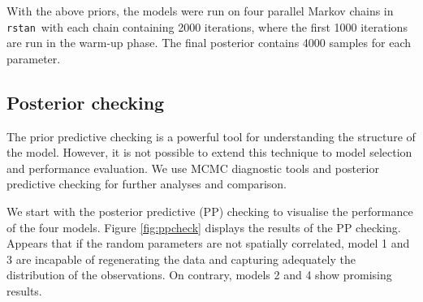 \documentclass[a4paper]{article}   	%
\newcommand{\rstan}{\texttt{rstan}}
\begin{document}
	With the above priors, the models were run on four parallel Markov chains in \rstan\ with each chain containing 2000 iterations, where the first 1000 iterations are run in the warm-up phase. The final posterior contains 4000 samples for each parameter. 	
	
	\subsection{Posterior checking}\label{ss:PostCheck}
	
	The prior predictive checking is a powerful tool for understanding the structure of the model. However, it is not possible to extend this technique to model selection and performance evaluation. We use MCMC diagnostic tools and posterior predictive checking for further analyses and comparison. 	
	
	We start with the posterior predictive (PP) checking to visualise the performance of the four models. Figure \ref{fig:ppcheck} displays the results of the PP checking. Appears that if the random parameters are not spatially correlated, model 1 and 3 are incapable of regenerating the data and capturing adequately the distribution of the observations. On contrary, models 2 and 4 show promising results. 	
	
\end{document}
